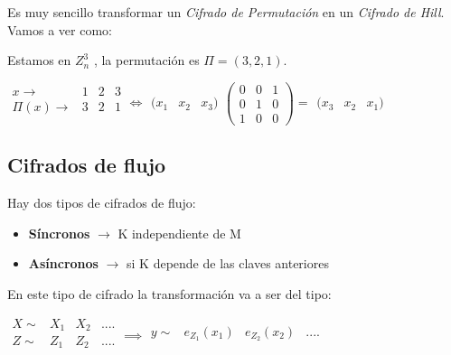 Es muy sencillo transformar un \textit{Cifrado de Permutación} en un \textit{Cifrado de Hill}. Vamos a ver como:

\begin{example}
	
	Estamos en $Z^3_n$ , la permutación es $\Pi = (3,2,1)$.
	
	$\begin{matrix}
		x\rightarrow & 1 & 2 & 3\\
		\Pi(x)\rightarrow & 3 & 2 & 1\\
	\end{matrix} \iff \begin{matrix}
	(x_1 & x_2 & x_3)
	\end{matrix} \left(\begin{matrix}
		0 & 0 & 1\\ 0 & 1 & 0\\ 1 & 0 & 0
	\end{matrix}\right) = \begin{matrix}
	(x_3 & x_2 & x_1)
	\end{matrix}$
\end{example}

\subsection{Cifrados de flujo}

Hay dos tipos de cifrados de flujo:
\begin{itemize}
	\item \textbf{Síncronos} $\rightarrow$ K independiente de M
	\item \textbf{Asíncronos} $\rightarrow$ si K depende de las claves anteriores
\end{itemize}

En este tipo de cifrado la transformación va a ser del tipo:

$\begin{matrix}
 X \sim & X_1 & X_2 & ....\\
 Z \sim & Z_1 & Z_2 & ....\\
\end{matrix} \implies \begin{matrix}
y \sim & e_{Z_1}(x_1) & e_{Z_2}(x_2) & ....\\
\end{matrix}$

